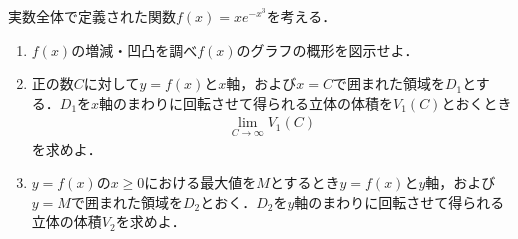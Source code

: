 \documentclass[../../main.tex]{subfiles}
\begin{document}
実数全体で定義された関数$f(x) = xe^{-x^3}$を考える．

\begin{enumerate}
  \item $f(x)$の増減・凹凸を調べ$f(x)$のグラフの概形を図示せよ．
  \item 正の数$C$に対して$y=f(x)$と$x$軸，および$x = C$で囲まれた領域を$D_1$とする．$D_1$を$x$軸のまわりに回転させて得られる立体の体積を$V_1(C)$とおくとき
    \begin{align}
      \lim_{C \to \infty} V_1(C)
    \end{align}
    を求めよ．
  \item $y = f(x)$の$x \geq 0$における最大値を$M$とするとき$y = f(x)$と$y$軸，および$y = M$で囲まれた領域を$D_2$とおく．$D_2$を$y$軸のまわりに回転させて得られる立体の体積$V_2$を求めよ．
\end{enumerate}
\end{document}
